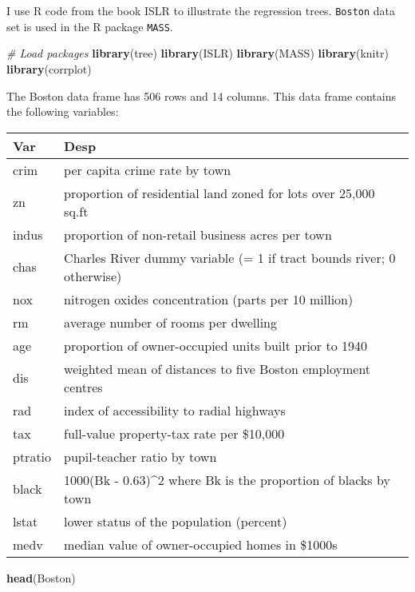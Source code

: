 \documentclass[]{book}
\newenvironment{Shaded}{\begin{snugshade}}{\end{snugshade}}
\newcommand{\CommentTok}[1]{\textcolor[rgb]{0.56,0.35,0.01}{\textit{#1}}}
\newcommand{\KeywordTok}[1]{\textcolor[rgb]{0.13,0.29,0.53}{\textbf{#1}}}
\newcommand{\NormalTok}[1]{#1}
\begin{document}
I use R code from the book ISLR \citep{James2014} to illustrate the regression trees. \texttt{Boston} data set is used in the R package \texttt{MASS}.

\begin{Shaded}
\begin{Highlighting}[]
\CommentTok{# Load packages}
\KeywordTok{library}\NormalTok{(tree)}
\KeywordTok{library}\NormalTok{(ISLR)}
\KeywordTok{library}\NormalTok{(MASS)}
\KeywordTok{library}\NormalTok{(knitr)}
\KeywordTok{library}\NormalTok{(corrplot)}
\end{Highlighting}
\end{Shaded}

The Boston data frame has 506 rows and 14 columns. This data frame contains the following variables:

\begin{tabular}{l|l}
\hline
Var & Desp\\
\hline
crim & per capita crime rate by town\\
\hline
zn & proportion of residential land zoned for lots over 25,000 sq.ft\\
\hline
indus & proportion of non-retail business acres per town\\
\hline
chas & Charles River dummy variable (= 1 if tract bounds river; 0 otherwise)\\
\hline
nox & nitrogen oxides concentration (parts per 10 million)\\
\hline
rm & average number of rooms per dwelling\\
\hline
age & proportion of owner-occupied units built prior to 1940\\
\hline
dis & weighted mean of distances to five Boston employment centres\\
\hline
rad & index of accessibility to radial highways\\
\hline
tax & full-value property-tax rate per \$10,000\\
\hline
ptratio & pupil-teacher ratio by town\\
\hline
black & 1000(Bk - 0.63)\textasciicircum{}2 where Bk is the proportion of blacks by town\\
\hline
lstat & lower status of the population (percent)\\
\hline
medv & median value of owner-occupied homes in \$1000s\\
\hline
\end{tabular}

\begin{Shaded}
\begin{Highlighting}[]
\KeywordTok{head}\NormalTok{(Boston)}
\end{Highlighting}
\end{Shaded}
\end{document}
